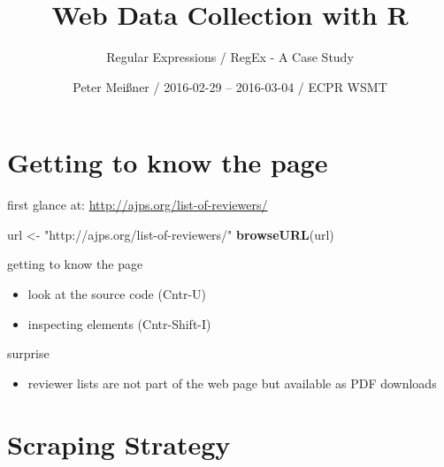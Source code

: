 \documentclass[ignorenonframetext,]{beamer}
\title{Web Data Collection with R}
\subtitle{Regular Expressions / RegEx - A Case Study}
\author{Peter Meißner / 2016-02-29 -- 2016-03-04 / ECPR WSMT}
\date{}
\newenvironment{Shaded}{\begin{snugshade}}{\end{snugshade}}
\newcommand{\KeywordTok}[1]{\textcolor[rgb]{0.13,0.29,0.53}{\textbf{{#1}}}}
\newcommand{\StringTok}[1]{\textcolor[rgb]{0.31,0.60,0.02}{{#1}}}
\newcommand{\NormalTok}[1]{{#1}}
\providecommand{\tightlist}{%
  \setlength{\itemsep}{0pt}\setlength{\parskip}{0pt}}
\begin{document}
\frame{\titlepage}

\begin{frame}
\tableofcontents[hideallsubsections]
\end{frame}

\section{Getting to know the page}\label{getting-to-know-the-page}

\begin{frame}[fragile]{first glance at:
\url{http://ajps.org/list-of-reviewers/}}

\begin{Shaded}
\begin{Highlighting}[]
\NormalTok{url <-}\StringTok{ "http://ajps.org/list-of-reviewers/"}
\KeywordTok{browseURL}\NormalTok{(url)}
\end{Highlighting}
\end{Shaded}

\end{frame}

\begin{frame}{getting to know the page}

\begin{itemize}
\tightlist
\item
  look at the source code (Cntr-U)
\item
  inspecting elements (Cntr-Shift-I)
\end{itemize}

\end{frame}

\begin{frame}{surprise}

\begin{itemize}
\tightlist
\item
  reviewer lists are not part of the web page but available as PDF
  downloads
\end{itemize}

\end{frame}

\section{Scraping Strategy}\label{scraping-strategy}
\end{document}
